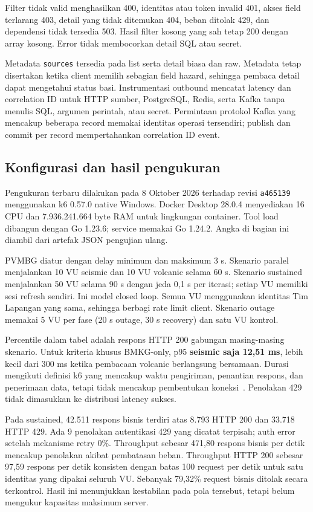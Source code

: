 Filter tidak valid menghasilkan 400, identitas atau token invalid 401, akses field terlarang 403, detail yang tidak ditemukan 404, beban ditolak 429, dan dependensi tidak tersedia 503. Hasil filter kosong yang sah tetap 200 dengan array kosong. Error tidak membocorkan detail SQL atau secret.

Metadata \texttt{sources} tersedia pada list serta detail biasa dan raw. Metadata tetap disertakan ketika client memilih sebagian field hazard, sehingga pembaca detail dapat mengetahui status basi. Instrumentasi outbound mencatat latency dan correlation ID untuk HTTP sumber, PostgreSQL, Redis, serta Kafka tanpa menulis SQL, argumen perintah, atau secret. Permintaan protokol Kafka yang mencakup beberapa record memakai identitas operasi tersendiri; publish dan commit per record mempertahankan correlation ID event.

\subsection{Konfigurasi dan hasil pengukuran}
Pengukuran terbaru dilakukan pada 8 Oktober 2026 terhadap revisi \texttt{a465139} menggunakan k6 0.57.0 native Windows. Docker Desktop 28.0.4 menyediakan 16 CPU dan 7.936.241.664 byte RAM untuk lingkungan container. Tool load dibangun dengan Go 1.23.6; service memakai Go 1.24.2. Angka di bagian ini diambil dari artefak JSON pengujian ulang.

PVMBG diatur dengan delay minimum dan maksimum 3 s. Skenario paralel menjalankan 10 VU seismic dan 10 VU volcanic selama 60 s. Skenario sustained menjalankan 50 VU selama 90 s dengan jeda 0,1 s per iterasi; setiap VU memiliki sesi refresh sendiri. Ini model closed loop. Semua VU menggunakan identitas Tim Lapangan yang sama, sehingga berbagi rate limit client. Skenario outage memakai 5 VU per fase (20 s outage, 30 s recovery) dan satu VU kontrol.



Percentile dalam tabel adalah respons HTTP 200 gabungan masing-masing skenario. Untuk kriteria khusus BMKG-only, p95 \textbf{seismic saja 12,51 ms}, lebih kecil dari 300 ms ketika pembacaan volcanic berlangsung bersamaan. Durasi mengikuti definisi k6 yang mencakup waktu pengiriman, penantian respons, dan penerimaan data, tetapi tidak mencakup pembentukan koneksi~\cite{k6-metrics}. Penolakan 429 tidak dimasukkan ke distribusi latency sukses.

Pada sustained, 42.511 respons bisnis terdiri atas 8.793 HTTP 200 dan 33.718 HTTP 429. Ada 9 penolakan autentikasi 429 yang dicatat terpisah; auth error setelah mekanisme retry 0\%. Throughput sebesar 471,80 respons bisnis per detik mencakup penolakan akibat pembatasan beban. Throughput HTTP 200 sebesar 97,59 respons per detik konsisten dengan batas 100 request per detik untuk satu identitas yang dipakai seluruh VU. Sebanyak 79,32\% request bisnis ditolak secara terkontrol. Hasil ini menunjukkan kestabilan pada pola tersebut, tetapi belum mengukur kapasitas maksimum server.

